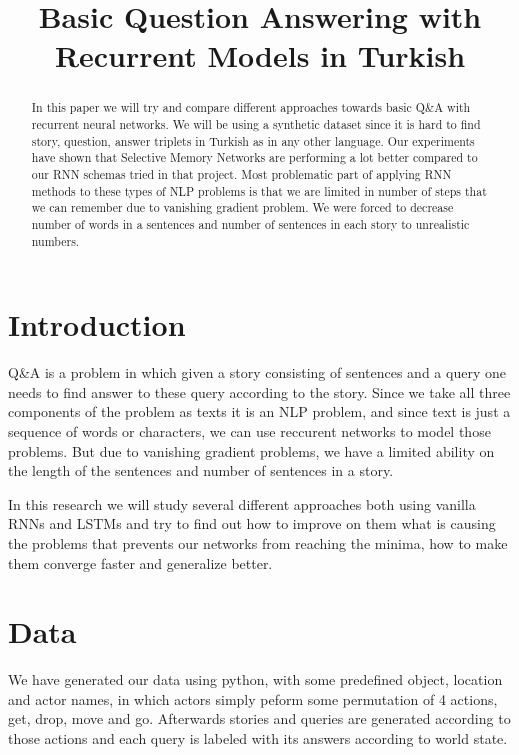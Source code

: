 \documentclass[conference,compsoc]{IEEEtran}
\begin{document}
\title{Basic Question Answering with Recurrent Models in Turkish}
\author{
}

\maketitle

\begin{abstract}
In this paper we will try and compare different approaches towards basic
Q\&A with recurrent neural networks. We will be using a synthetic dataset
since it is hard to find story, question, answer triplets in Turkish as in
any other language. Our experiments have shown that Selective Memory Networks
are performing a lot better compared to our RNN schemas tried in that project.
Most problematic part of applying RNN methods to these types of NLP problems
is that we are limited in number of steps that we can remember due to vanishing
gradient problem. We were forced to decrease number of words in a sentences
and number of sentences in each story to unrealistic numbers.
\end{abstract}

\section{Introduction}
Q\&A is a problem in which given a story consisting of sentences and a query
one needs to find answer to these query according to the story. Since we take
all three components of the problem as texts it is an NLP problem, and since
text is just a sequence of words or characters, we can use reccurent networks to
model those problems. But due to vanishing gradient problems, we have a limited
ability on the length of the sentences and number of sentences in a story.

In this research we will study several different approaches both using vanilla RNNs
and LSTMs and try to find out how to improve on them what is causing the problems
that prevents our networks from reaching the minima, how to make them converge faster
and generalize better.

\section{Data}
We have generated our data using python, with some predefined object, location and 
actor names, in which actors simply peform some permutation of 4 actions, get, drop,
move and go. Afterwards stories and queries are generated according to those actions
and each query is labeled with its answers according to world state.
\end{document}
